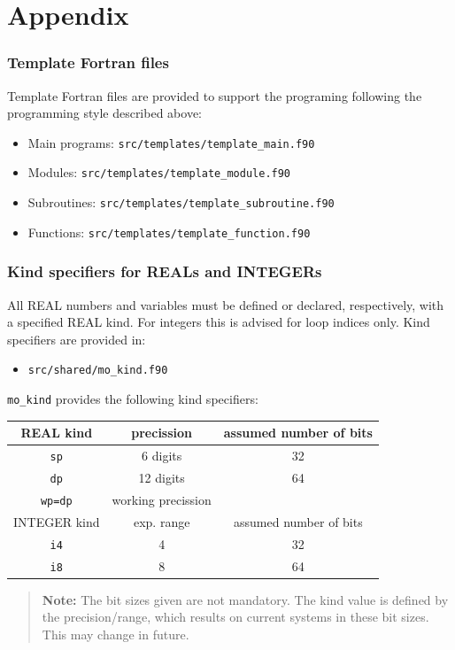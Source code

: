 \documentclass[a4paper,11pt,DIV16,BCOR1cm,titlepage]{scrartcl}
\begin{document}
\newpage

\part{Appendix}  

\begin{appendix}  

\section{Template Fortran files}  
%
Template Fortran files are provided to support the programing following the programming 
style described above:
\begin{itemize}
\item Main programs: \texttt{src/templates/template\_main.f90}
\item Modules: \texttt{src/templates/template\_module.f90}
\item Subroutines: \texttt{src/templates/template\_subroutine.f90}
\item Functions: \texttt{src/templates/template\_function.f90}
\end{itemize}

\section{Kind specifiers for REALs and INTEGERs}\label{app_knd}  
%
All REAL numbers and variables must be defined or declared, respectively, with a specified 
REAL kind. For integers this is advised for loop indices only. Kind specifiers are provided in: 
\begin{itemize}
\item \texttt{src/shared/mo\_kind.f90}
\end{itemize}
%
\texttt{mo\_kind} provides the following kind specifiers:  
%
\begin{center}  
\begin{tabular}{|c|c|c|}
\hline  
REAL kind	& precission			& assumed number of bits	\\
\hline
\hline   
\texttt{sp}		& 6 digits				& 32						\\
\texttt{dp}		& 12 digits			& 64						\\
\texttt{wp=dp}   & working precission		&						\\
\hline
\hline   
INTEGER kind	& exp. range			& assumed number of bits	\\
\hline
\hline   
\texttt{i4}		& 4					& 32						\\   
\texttt{i8}		& 8					& 64						\\
\hline 
\end{tabular}    
\end{center}
%
\begin{quote}  
\textbf{Note:}  
%
The bit sizes given are not mandatory. The kind value is 
defined by the precision/range, which results on current 
systems in these bit sizes. This may change in future.
\end{quote}  


\end{appendix}
\end{document}

